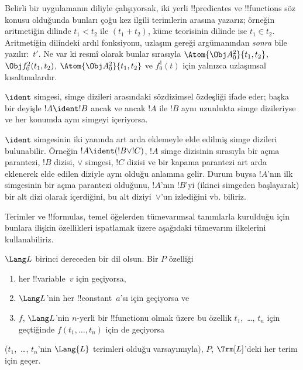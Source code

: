 Belirli bir uygulamanın diliyle çalışıyorsak, iki yerli !!{predicate}s
ve !!{function}s söz konusu olduğunda bunları çoğu kez ilgili terimlerin arasına yazarız; örneğin
aritmetiğin dilinde $t_1 < t_2$ ile $(t_1 + t_2)$, küme teorisinin
dilinde ise $t_1 \in t_2$. Aritmetiğin dilindeki ardıl fonksiyonu,
uzlaşım gereği argümanından \emph{sonra} bile yazılır:~$t'$. Ne var ki
resmî olarak bunlar sırasıyla $\Atom{\Obj A^2_0}{t_1, t_2}$,
$\Obj f^2_0(t_1, t_2)$, $\Atom{\Obj A^2_0}{t_1, t_2}$ ve $f^1_0(t)$
için yalnızca uzlaşımsal kısaltmalardır.

\begin{defn}
$\ident$ simgesi, simge dizileri arasındaki sözdizimsel özdeşliği ifade
eder; başka bir deyişle $!A \ident !B$ ancak ve ancak $!A$ ile $!B$ aynı
uzunlukta simge dizileriyse ve her konumda aynı simgeyi içeriyorsa.
\end{defn}

$\ident$ simgesinin iki yanında art arda eklemeyle elde edilmiş simge
dizileri bulunabilir. Örneğin $!A \ident (!B \lor !C)$, $!A$ simge
dizisinin sırasıyla bir açma parantezi, $!B$ dizisi, $\lor$ simgesi,
$!C$ dizisi ve bir kapama parantezi art arda eklenerek elde edilen
diziyle aynı olduğu anlamına gelir. Durum buysa $!A$'nın ilk simgesinin
bir açma parantezi olduğunu, $!A$'nın $!B$'yi (ikinci simgeden
başlayarak) bir alt dizi olarak içerdiğini, bu alt diziyi~$\lor$'un
izlediğini vb. biliriz.

Terimler ve !!{formula}s, temel öğelerden tümevarımsal tanımlarla
kurulduğu için bunlara ilişkin özellikleri ispatlamak üzere aşağıdaki
tümevarım ilkelerini kullanabiliriz.

\begin{lem}
    $\Lang L$ birinci dereceden bir dil olsun.
    Bir $P$ özelliği
    \begin{enumerate}
        \item her !!{variable}~$v$ için geçiyorsa,
        \item $\Lang L$'nin her !!{constant}~$a$'sı için geçiyorsa ve
        \item $f$, $\Lang L$'nin $n$-yerli bir !!{function}{}u olmak
        üzere bu özellik $t_1$,~\dots, $t_n$ için geçtiğinde
        $f(t_1,\dotsc,t_n)$ için de geçiyorsa
    \end{enumerate}
    ($t_1$,~\dots, $t_n$'nin $\Lang{L}$ terimleri olduğu varsayımıyla),
    $P$, $\Trm[L]$'deki her terim için geçer.
\end{lem}

